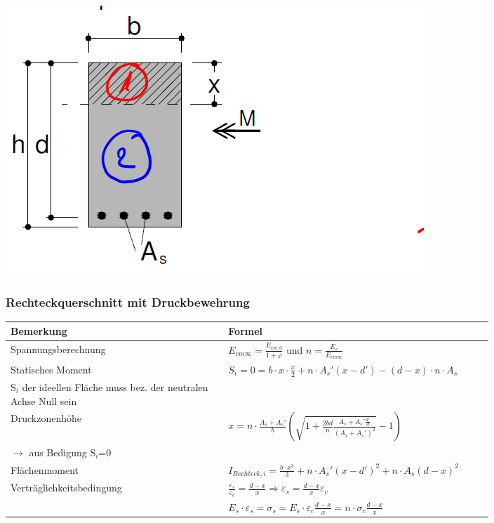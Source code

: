 \begin{landscape}
\begin{multicols}{3}
\begin{tabular}{p{0.4\linewidth}|p{0.4\linewidth}|l}
		\end{tabular}
		
		\includegraphics[width=0.6\linewidth]{images/Risse2QSRechtecko.PNG}
		
		
		
		
		
		\subsubsection{Rechteckquerschnitt mit Druckbewehrung}
		
		
		\begin{tabular}{p{0.4\linewidth}|p{0.4\linewidth}}
			
			Bemerkung		& Formel	 \\ \hline
			
			
			\hspace*{0pt} Spannungsberechnung	& $ E_{cm\infty} = \frac{E_{cm,0}}{1 + \varphi} $ und $ n = \frac{E_s}{E_{cm\infty}} $  \\
			
			Statisches Moment	& $ S_i = 0 = b \cdot x \cdot \frac{x}{2} + n \cdot A_s' (x - d') - (d - x) \cdot n \cdot A_s $  \\
			S$_i$ der ideellen Fläche muss bez. der neutralen Achse Null sein &	 \\
			
			Druckzonenhöhe		& $ x = n \cdot \frac{A_s + A_s'}{b} \left( \sqrt{1 + \frac{2 b d}{n} \frac{A_s + A_s' \frac{d'}{d}}{(A_s + A_s')^2} } - 1 \right) $   \\
			$ \rightarrow $ aus Bedigung S$_i$=0 &  \\
			
			Flächenmoment		& $ I_{Rechteck,i} = \frac{b \cdot x^3}{3} + n \cdot A_s' (x - d')^2 + n \cdot A_s (d - x)^2 $	  \\
			
			\hspace*{0pt} Verträglichkeitsbedingung & $ \frac{\varepsilon_s}{\varepsilon_c} = \frac{d - x}{x}
			\Rightarrow \varepsilon_s = \frac{d - x}{x} \varepsilon_c $	 \\
			& $ E_s \cdot \varepsilon_s = \sigma_s = E_s \cdot \varepsilon_c \frac{d - x}{x} = n \cdot \sigma_c \frac{d - x}{x} $		\\
			

\end{tabular}
\end{multicols}
\end{landscape}
